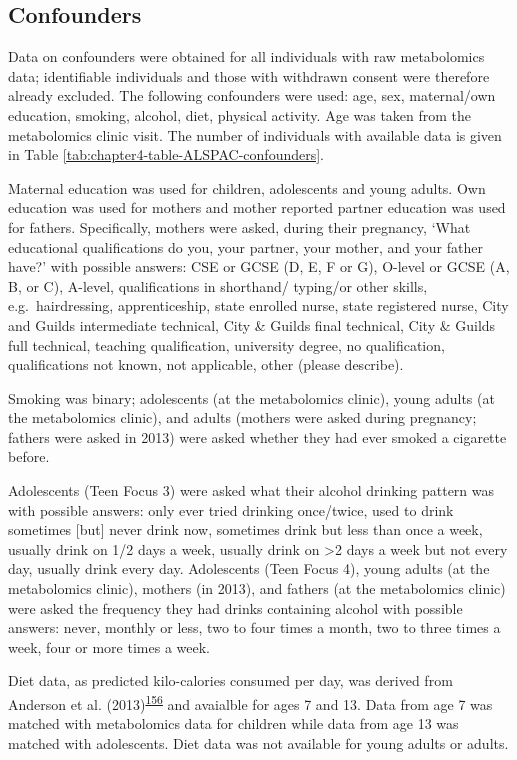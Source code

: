 \documentclass[11pt,twoside]{bristolthesis}
\begin{document}
\hypertarget{confounders}{%
\subsection{Confounders}\label{confounders}}

Data on confounders were obtained for all individuals with raw metabolomics data; identifiable individuals and those with withdrawn consent were therefore already excluded. The following confounders were used: age, sex, maternal/own education, smoking, alcohol, diet, physical activity. Age was taken from the metabolomics clinic visit. The number of individuals with available data is given in Table \ref{tab:chapter4-table-ALSPAC-confounders}.

Maternal education was used for children, adolescents and young adults. Own education was used for mothers and mother reported partner education was used for fathers. Specifically, mothers were asked, during their pregnancy, `What educational qualifications do you, your partner, your mother, and your father have?' with possible answers: CSE or GCSE (D, E, F or G), O-level or GCSE (A, B, or C), A-level, qualifications in shorthand/ typing/or other skills, e.g.~hairdressing, apprenticeship, state enrolled nurse, state registered nurse, City and Guilds intermediate technical, City \& Guilds final technical, City \& Guilds full technical, teaching qualification, university degree, no qualification, qualifications not known, not applicable, other (please describe).

Smoking was binary; adolescents (at the metabolomics clinic), young adults (at the metabolomics clinic), and adults (mothers were asked during pregnancy; fathers were asked in 2013) were asked whether they had ever smoked a cigarette before.

Adolescents (Teen Focus 3) were asked what their alcohol drinking pattern was with possible answers: only ever tried drinking once/twice, used to drink sometimes {[}but{]} never drink now, sometimes drink but less than once a week, usually drink on 1/2 days a week, usually drink on \textgreater{}2 days a week but not every day, usually drink every day. Adolescents (Teen Focus 4), young adults (at the metabolomics clinic), mothers (in 2013), and fathers (at the metabolomics clinic) were asked the frequency they had drinks containing alcohol with possible answers: never, monthly or less, two to four times a month, two to three times a week, four or more times a week.

Diet data, as predicted kilo-calories consumed per day, was derived from Anderson et al. (2013)\textsuperscript{\protect\hyperlink{ref-Anderson2013}{156}} and avaialble for ages 7 and 13. Data from age 7 was matched with metabolomics data for children while data from age 13 was matched with adolescents. Diet data was not available for young adults or adults.
\end{document}

